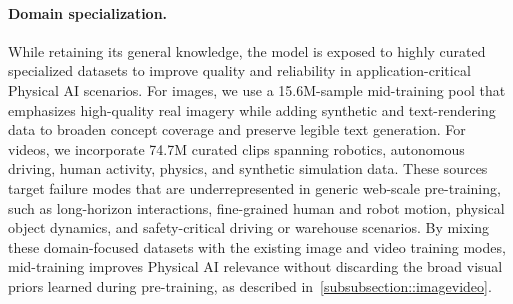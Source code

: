 \paragraph{Domain specialization.}
While retaining its general knowledge, the model is exposed to highly curated specialized datasets to improve quality and reliability in application-critical Physical AI scenarios. For images, we use a 15.6M-sample mid-training pool that emphasizes high-quality real imagery while adding synthetic and text-rendering data to broaden concept coverage and preserve legible text generation. For videos, we incorporate 74.7M curated clips spanning robotics, autonomous driving, human activity, physics, and synthetic simulation data. These sources target failure modes that are underrepresented in generic web-scale pre-training, such as long-horizon interactions, fine-grained human and robot motion, physical object dynamics, and safety-critical driving or warehouse scenarios. By mixing these domain-focused datasets with the existing image and video training modes, mid-training improves Physical AI relevance without discarding the broad visual priors learned during pre-training, as described in~\cref{subsubsection::imagevideo}.


